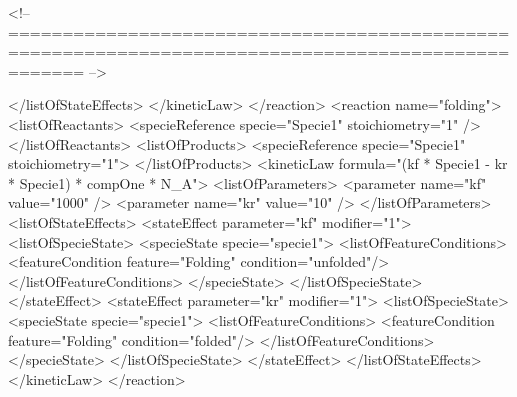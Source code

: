 \documentclass{cekarticle}
\newenvironment{changemargin}[2]{\begin{list}{}{%
\setlength{\leftmargin}{0pt}%
\setlength{\rightmargin}{0pt}%
\setlength{\listparindent}{\parindent}%
\setlength{\itemindent}{\parindent}%
\addtolength{\leftmargin}{#1}%
\addtolength{\rightmargin}{#2}%
}\item }{\end{list}}
\begin{document}
\begin{changemargin}{-2cm}{0cm}
\begin{example}
<!-- =================================================================================================== -->

                        </listOfStateEffects>
                    </kineticLaw>
                </reaction>
                <reaction name="folding">
                    <listOfReactants>
                        <specieReference specie="Specie1" stoichiometry="1" />
                    </listOfReactants>
                    <listOfProducts>
                        <specieReference specie="Specie1" stoichiometry="1">
                    </listOfProducts>
                    <kineticLaw formula="(kf * Specie1 - kr * Specie1) * compOne * N_A">
                        <listOfParameters>
                            <parameter name="kf" value="1000" />
                            <parameter name="kr" value="10" />
                        </listOfParameters>
                        <listOfStateEffects>
                            <stateEffect parameter="kf" modifier="1">
                                <listOfSpecieState>
                                    <specieState specie="specie1">
                                        <listOfFeatureConditions>
                                            <featureCondition feature="Folding" condition="unfolded"/>
                                        </listOfFeatureConditions>
                                    </specieState>
                                </listOfSpecieState>
                            </stateEffect>  
                            <stateEffect parameter="kr" modifier="1">
                                <listOfSpecieState>
                                    <specieState specie="specie1">
                                        <listOfFeatureConditions>
                                            <featureCondition feature="Folding" condition="folded"/>
                                        </listOfFeatureConditions>
                                    </specieState>
                                </listOfSpecieState>
                           </stateEffect>  
                        </listOfStateEffects>
                    </kineticLaw>
                </reaction>


\end{example}
\end{changemargin}
\end{document}
